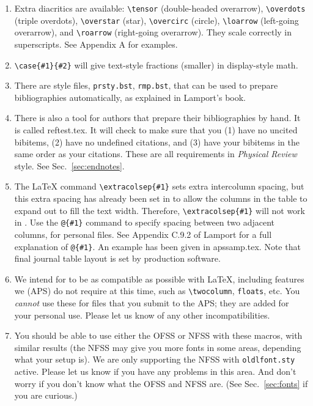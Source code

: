 \begin{enumerate}
\item Extra diacritics are available: \verb+\tensor+ (double-headed
overarrow), \verb+\overdots+ (triple overdots), \verb+\overstar+ (star),
\verb+\overcirc+ (circle), \verb+\loarrow+ (left-going overarrow), and
\verb+\roarrow+ (right-going overarrow). They scale correctly in
superscripts. See Appendix A for examples.

\item \verb+\case{#1}{#2}+ will give text-style fractions (smaller) in
display-style math.

\item There are \BibTeX{} style files, \verb+prsty.bst+,
\verb+rmp.bst+, that can be used
to prepare bibliographies automatically, as explained in Lamport's book.

\item There is also a tool for authors that prepare their bibliographies by
hand. It is called reftest.tex. It will check to make sure that you (1)
have no uncited bibitems, (2) have no undefined citations, and (3) have
your bibitems in the same order as your citations. These are all
requirements in {\it Physical Review\/} style. See Sec.\
\ref{sec:endnotes}.

\item The \LaTeX{} command \verb+\extracolsep{#1}+ sets extra intercolumn
spacing, but this extra spacing has already been set in \REVTeX{} to allow
the columns in the table to expand out to fill the text width. Therefore,
\verb+\extracolsep{#1}+ will not work in \REVTeX{}. Use the \verb+@{#1}+
command to specify spacing between two adjacent columns, for personal
files.  See Appendix C.9.2
of Lamport for a full explanation of \verb+@{#1}+. An example has been
given in apssamp.tex. Note that final journal table layout is set by
production software. 

\item We intend for \REVTeX{} to be as compatible as
possible with \LaTeX{}, including features we (APS) do not require at this
time, such as \verb+\twocolumn+, \verb+floats+, etc. You {\em
cannot\/} use these for files that you submit to the APS; they are added for
your personal use. Please let us know of any other incompatibilities.

\item You should be able to use either the OFSS or NFSS with these macros,
with similar results (the NFSS may give you more fonts in some areas,
depending what your setup is). We are only supporting the NFSS
with \verb+oldlfont.sty+ active. Please let us know if you have any
problems in this area. And don't worry if you don't know what the OFSS and
NFSS are. (See Sec.\ \ref{sec:fonts} if you are curious.) 

\end{enumerate}

